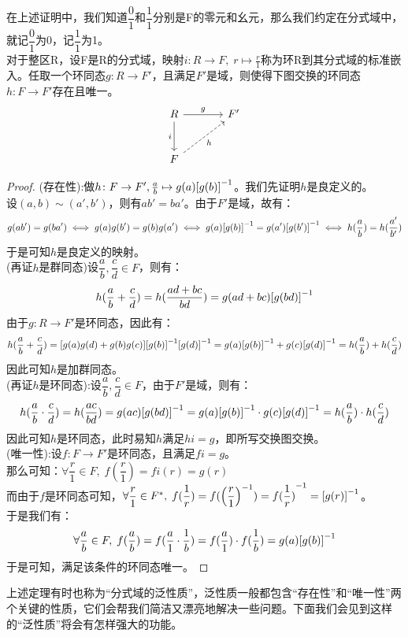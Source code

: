 在上述证明中，我们知道$\dfrac{0}{1}$和$\dfrac{1}{1}$分别是F的零元和幺元，那么我们约定在分式域中，就记$\dfrac{0}{1}$为0，记$\dfrac{1}{1}$为1。\\
对于整区R，设F是R的分式域，映射$i\colon R\to F,\; r\mapsto \frac{r}{1}$称为环R到其分式域的标准嵌入。任取一个环同态$g\colon R\to F'$，且满足$F'$是域，则使得下图交换的环同态$h\colon F\to F'$存在且唯一。
\[
\begin{tikzcd}[row sep=large, column sep=large]
R \arrow[r, "g"] \arrow[d, "i"'] & F' \\
F \arrow[ru, dashed, "h"'] &
\end{tikzcd}
\]
\begin{proof}
(存在性):做$h\colon F\to F',\frac{a}{b}\mapsto g(a){[g(b)]}^{-1}$。我们先证明$h$是良定义的。\\
设$(a,b)\sim (a',b')$，则有$ab'=ba'$。由于$F'$是域，故有：\\
\[
g(ab')=g(ba')\iff g(a)g(b')=g(b)g(a')\iff g(a){[g(b)]}^{-1}=g(a'){[g(b')]}^{-1}\iff h(\frac{a}{b})=h(\frac{a'}{b'})
\]
于是可知$h$是良定义的映射。\\
(再证$h$是群同态)设$\dfrac{a}{b},\dfrac{c}{d}\in F$，则有：
\[
h(\dfrac{a}{b}+\dfrac{c}{d})=h(\frac{ad+bc}{bd})=g(ad+bc){[g(bd)]}^{-1}
\]
由于$g\colon R\to F'$是环同态，因此有：
\[
h(\dfrac{a}{b}+\dfrac{c}{d})=[g(a)g(d)+g(b)g(c)]{[g(b)]}^{-1}{[g(d)]}^{-1}=g(a){[g(b)]}^{-1}+g(c){[g(d)]}^{-1}=h(\frac{a}{b})+h(\frac{c}{d})
\]
因此可知$h$是加群同态。\\
(再证$h$是环同态):设$\dfrac{a}{b},\dfrac{c}{d}\in F$，由于$F'$是域，则有：
\[
h(\frac{a}{b}\cdot \frac{c}{d})=h(\frac{ac}{bd})=g(ac){[g(bd)]}^{-1}=g(a){[g(b)]}^{-1}\cdot g(c){[g(d)]}^{-1}=h(\frac{a}{b})\cdot h(\frac{c}{d})
\]
因此可知$h$是环同态，此时易知$h$满足$hi=g$，即所写交换图交换。\\
(唯一性):设$f\colon F\to F'$是环同态，且满足$fi=g$。\\
那么可知：$\forall \dfrac{r}{1}\in F,\; f(\dfrac{r}{1})=fi(r)=g(r)$\\
而由于$f$是环同态可知，$\forall \dfrac{r}{1}\in F^*,\; f(\dfrac{1}{r})=f({\left(\dfrac{r}{1}\right)}^{-1})={f(\dfrac{1}{r})}^{-1}={[g(r)]}^{-1}$。\\
于是我们有：
\[
\forall \frac{a}{b}\in F,\; f(\frac{a}{b})=f(\frac{a}{1}\cdot \frac{1}{b})=f(\frac{a}{1})\cdot f(\frac{1}{b})=g(a){[g(b)]}^{-1}
\]
于是可知，满足该条件的环同态唯一。
\end{proof}
\indent 上述定理有时也称为“分式域的泛性质”，泛性质一般都包含“存在性”和“唯一性”两个关键的性质，它们会帮我们简洁又漂亮地解决一些问题。下面我们会见到这样的“泛性质”将会有怎样强大的功能。\\
